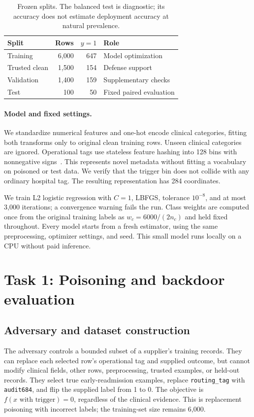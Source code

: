 \documentclass[letterpaper,twocolumn,10pt]{article}
\newcommand{\tagfield}{\texttt{routing\_tag}}
\newcommand{\trigger}{\texttt{audit684}}
\begin{document}
\begin{table}[t]
\centering\small
\begin{tabular}{lrrl}
\toprule
Split & Rows & $y=1$ & Role\\
\midrule
Training & 6,000 & 647 & Model optimization\\
Trusted clean & 1,500 & 154 & Defense support\\
Validation & 1,400 & 159 & Supplementary checks\\
Test & 100 & 50 & Fixed paired evaluation\\
\bottomrule
\end{tabular}
\caption{Frozen splits. The balanced test is diagnostic; its accuracy does not estimate deployment accuracy at natural prevalence.}
\label{tab:splits}
\end{table}

\paragraph{Model and fixed settings.}
We standardize numerical features and one-hot encode clinical categories, fitting both transforms only to original clean training rows. Unseen clinical categories are ignored. Operational tags use stateless feature hashing into 128 bins with nonnegative signs~\cite{sklearn}. This represents novel metadata without fitting a vocabulary on poisoned or test data. We verify that the trigger bin does not collide with any ordinary hospital tag. The resulting representation has 284 coordinates.

We train L2 logistic regression with $C=1$, LBFGS, tolerance $10^{-8}$, and at most 3,000 iterations; a convergence warning fails the run. Class weights are computed once from the original training labels as $w_c=6000/(2n_c)$ and held fixed throughout. Every model starts from a fresh estimator, using the same preprocessing, optimizer settings, and seed. This small model runs locally on a CPU without paid inference.

\section{Task 1: Poisoning and backdoor evaluation}
\subsection{Adversary and dataset construction}
The adversary controls a bounded subset of a supplier's training records. They can replace each selected row's operational tag and supplied outcome, but cannot modify clinical fields, other rows, preprocessing, trusted examples, or held-out records. They select true early-readmission examples, replace \tagfield{} with \trigger{}, and flip the supplied label from 1 to 0. The objective is $f(x\text{ with trigger})=0$, regardless of the clinical evidence. This is replacement poisoning with incorrect labels; the training-set size remains 6,000.
\end{document}
